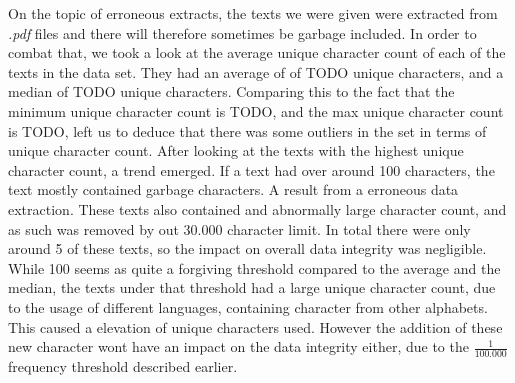 On the topic of erroneous extracts, the texts we were given were extracted from
\textit{.pdf} files and there will therefore sometimes be garbage included.
In order to combat that, we took a look at the average unique character count
of each of the texts in the data set. They had an average of of TODO unique
characters, and a median of TODO unique characters. Comparing this to the
fact that the minimum unique character count is TODO, and the max unique
character count is TODO, left us to deduce that there was some outliers in the
set in terms of unique character count. After looking at the texts with the
highest unique character count, a trend emerged. If a text had over around
100 characters, the text mostly contained garbage characters. A result from
a erroneous data extraction. These texts also contained and abnormally large
character count, and as such was removed by out 30.000 character limit. In total
there were only around 5 of these texts, so the impact on overall data integrity
was negligible. While 100 seems as quite a forgiving threshold compared to
the average and the median, the texts under that threshold had a large unique
character count, due to the usage of different languages, containing character
from other alphabets. This caused a elevation of unique characters used. However
the addition of these new character wont have an impact on the data integrity
either, due to the $\frac{1}{100.000}$ frequency threshold described earlier.
